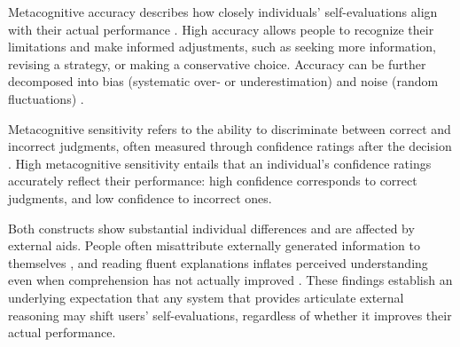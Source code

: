 \documentclass[acmlarge,review=true, anonymous=true]{acmart}
\begin{document}
Metacognitive accuracy describes how closely individuals' self-evaluations align with their actual performance \cite{fleming2024metacognition, colombatto2023illusions}. High accuracy allows people to recognize their limitations and make informed adjustments, such as seeking more information, revising a strategy, or making a conservative choice. Accuracy can be further decomposed into bias (systematic over- or underestimation) and noise (random fluctuations) \cite{fiedler2019metacognition}.

Metacognitive sensitivity refers to the ability to discriminate between correct and incorrect judgments, often measured through confidence ratings after the decision \cite{fleming2024metacognition}. High metacognitive sensitivity entails that an individual's confidence ratings accurately reflect their performance: high confidence corresponds to correct judgments, and low confidence to incorrect ones.

Both constructs show substantial individual differences \cite{kelemen2000individual, ackerman2017meta} and are affected by external aids. People often misattribute externally generated information to themselves \cite{johnson_source_1993}, and reading fluent explanations inflates perceived understanding even when comprehension has not actually improved \cite{fisher2021harder}. These findings establish an underlying expectation that any system that provides articulate external reasoning may shift users' self-evaluations, regardless of whether it improves their actual performance.

\end{document}
